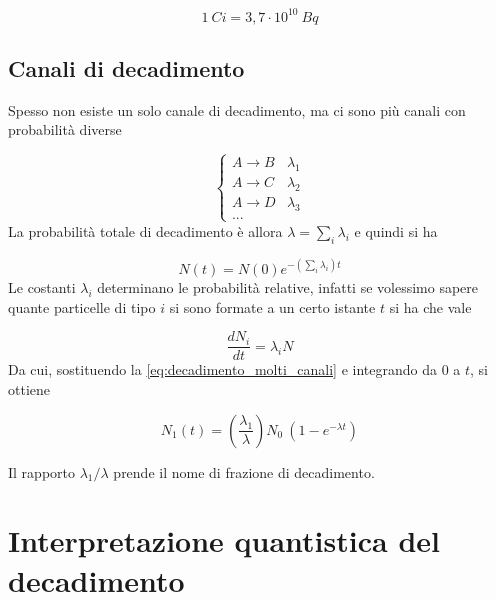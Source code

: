 \begin{equation*}
    1 \ Ci = 3,7 \cdot 10^{10} \ Bq
\end{equation*}

\subsection{Canali di decadimento}

Spesso non esiste un solo canale di decadimento, ma ci sono più canali con probabilità diverse

\[
\begin{cases}
    A \longrightarrow B & \lambda_1 \\
    A \longrightarrow C & \lambda_2 \\
    A \longrightarrow D & \lambda_3 \\
    ...
\end{cases}
\]
La probabilità totale di decadimento è allora $\lambda = \sum_i \lambda_i$ e quindi si ha 

\begin{equation}
    N(t) = N(0) e^{- (\sum_i \lambda_i) t}
    \label{eq:decadimento_molti_canali}
\end{equation}
Le costanti $\lambda_i$ determinano le probabilità relative, infatti se volessimo sapere quante particelle di tipo $i$ si sono formate a un certo istante $t$ si ha che vale 

\begin{equation}
    \frac{dN_i}{dt} = \lambda_i N
\end{equation}
Da cui, sostituendo la \eqref{eq:decadimento_molti_canali} e integrando da $0$ a $t$, si ottiene 

\begin{tcolorbox}[colback=black!5!white, colframe=black!45!white, boxrule=0.8pt]
\begin{equation}
    N_1(t) = \left(\frac{\lambda_1}{\lambda}\right) N_0 \ (1 - e^{-\lambda t})
\end{equation}
\end{tcolorbox}
Il rapporto $\lambda_1/\lambda$ prende il nome di frazione di decadimento. 

\newpage

\section{Interpretazione quantistica del decadimento}

